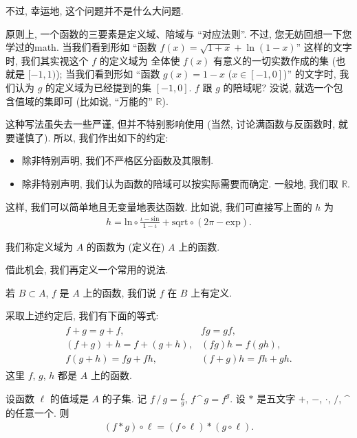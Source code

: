 不过, 幸运地, 这个问题并不是什么大问题.

原则上, 一个函数的三要素是定义域、陪域与 ``对应法则''.
不过, 您无妨回想一下您学过的\gls{math}.
当我们看到形如
``函数 $f(x) = \sqrt{1 + x} + \operatorname{ln} {(1 - x)}$''
这样的文字时,
我们其实视这个 $f$ 的定义域为%
全体使 $f(x)$ 有意义的一切实数作成的集
(也就是 $[-1, 1)$);
当我们看到形如
``函数 $g(x) = 1 - x$ ($x \in [-1, 0]$)'' 的文字时,
我们认为 $g$ 的定义域为已经提到的集 $[-1, 0]$.
$f$ 跟 $g$ 的陪域呢?
没说, 就选一个包含值域的集即可
(比如说, ``万能的'' $\mathbb{R}$).

这种写法虽失去一些严谨, 但并不特别影响使用
(当然, 讨论满函数与反函数时, 就要谨慎了).
所以, 我们作出如下的约定:
\begin{itemize}
    \item 除非特别声明, 我们不严格区分函数及其限制.
    \item 除非特别声明, 我们认为函数的陪域可以按实际需要而确定.
          一般地, 我们取 $\mathbb{R}$.
\end{itemize}
这样, 我们可以简单地且无变量地表达函数.
比如说, 我们可直接写上面的 $h$ 为
\begin{align*}
    h = {\mathrm{ln}} \circ \frac{\iota - \mathrm{sin}}{1 - \iota}
    + \mathrm{sqrt} \circ (2\pi - \mathrm{exp}).
\end{align*}

\begin{definition}
    我们称定义域为 $A$ 的函数为 (定义在) $A$ 上的函数.
\end{definition}

借此机会, 我们再定义一个常用的说法.

\begin{definition}
    若 $B \subset A$, $f$ 是 $A$ 上的函数,
    我们说 $f$ 在 $B$ 上有定义.
\end{definition}

采取上述约定后, 我们有下面的等式:
\begin{align*}
    \begin{array}{ll}
        f + g = g + f,             & fg = gf,            \\
        (f + g) + h = f + (g + h), & (fg)h = f(gh),      \\
        f(g + h) = fg + fh,        & (f + g)h = fh + gh.
    \end{array}
\end{align*}
这里 $f$, $g$, $h$ 都是 $A$ 上的函数.

设函数 $\ell$ 的值域是 $A$ 的子集.
记 $f \, / \, g = \frac{f}{g}$,
$f \, \text{\textasciicircum} \, g = f^g$.
设 $\ast$ 是五文字
$+$, $-$, $\cdot$, $/$, $\text{\textasciicircum}$
的任意一个.
则
\begin{align*}
    (f \ast g) \circ \ell = (f \circ \ell) \ast (g \circ \ell).
\end{align*}

